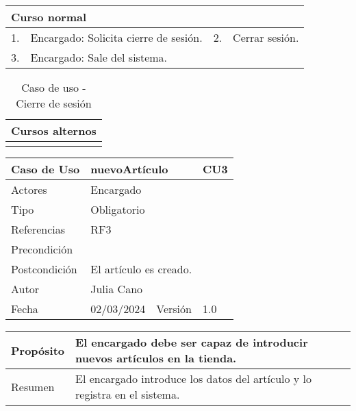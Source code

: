 \begin{table}[H]
	\centering
	\begin{tabular}{| m{} | m{} | m{} | m{} |}
		\hline
		\multicolumn{4}{|m{0.9\textwidth}|}{Curso normal}     \\ 
		\hline
		1. & Encargado: Solicita cierre de sesión. & 2. & Cerrar sesión. \\ 
		\hline
		3. & Encargado: Sale del sistema. &  &  \\ 
		\hline
	\end{tabular}
\end{table}

\begin{table}[H]
	\centering
	\begin{tabular}{| m{} | m{} | m{} | m{} |}
		\hline
		\multicolumn{4}{|m{0.9\textwidth}|}{Cursos alternos}     \\ 
		\hline
		& \multicolumn{3}{m{0.67\textwidth}|}{} \\ 
		\hline
	\end{tabular}
	\caption{Caso de uso - Cierre de sesión}
\end{table}

\newpage


\begin{table}[H]
	\centering
	\begin{tabular}{| m{} | m{} | m{} | m{} |}
		\hline
		\rowcolor{grayshade} Caso de Uso & \multicolumn{2}{|l|}{nuevoArtículo} &  CU3\\ 
		\hline
		Actores & \multicolumn{3}{l|}{Encargado} \\ 
		\hline
		Tipo & \multicolumn{3}{l|}{Obligatorio} \\ 
		\hline
		Referencias & \multicolumn{3}{l|}{RF3} \\ 
		\hline
		Precondición & \multicolumn{3}{l|}{} \\ 
		\hline
		Postcondición & \multicolumn{3}{l|}{El artículo es creado.} \\ 
		\hline
		Autor & \multicolumn{3}{l|}{Julia Cano} \\ 
		\hline
		Fecha & 02/03/2024 & Versión & 1.0 \\
		\hline
	\end{tabular}
\end{table}

\begin{table}[H]
	\centering
	\begin{tabular}{| m{} | m{} | m{} | m{} |}
		\hline
		Propósito & \multicolumn{3}{m{0.67\textwidth}|}{El encargado debe ser capaz de introducir nuevos artículos en la tienda.}   \\ 
		\hline
		Resumen & \multicolumn{3}{m{0.67\textwidth}|}{El encargado introduce los datos del artículo y lo registra en el sistema.} \\ 
		\hline
	\end{tabular}
\end{table}

